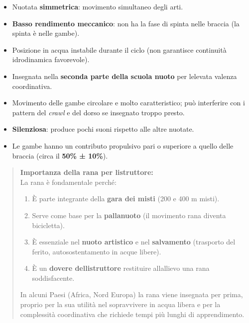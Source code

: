 \documentclass[a4paper,11pt]{article}
\providecommand{\tightlist}{%
  \setlength{\itemsep}{0pt}\setlength{\parskip}{0pt}}
\begin{document}
\begin{itemize}
      \tightlist
      \item
            Nuotata \textbf{simmetrica}: movimento simultaneo degli arti.
      \item
            \textbf{Basso rendimento meccanico}: non ha la fase di spinta nelle
            braccia (la spinta è nelle gambe).
      \item
            Posizione in acqua instabile durante il ciclo (non garantisce
            continuità idrodinamica favorevole).
      \item
            Insegnata nella \textbf{seconda parte della scuola nuoto} per
            l\textquotesingle elevata valenza coordinativa.
      \item
            Movimento delle gambe circolare e molto caratteristico; può
            interferire con i pattern del \emph{crawl} e del dorso se insegnato
            troppo presto.
      \item
            \textbf{Silenziosa}: produce pochi suoni rispetto alle altre nuotate.
      \item
            Le gambe hanno un contributo propulsivo pari o superiore a quello
            delle braccia (circa il \textbf{50\% ± 10\%}).
\end{itemize}

\begin{quote}
      \textbf{Importanza della rana per l\textquotesingle istruttore:}\\
      La rana è fondamentale perché:

      \begin{enumerate}
            \tightlist
            \item
                  È parte integrante della \textbf{gara dei misti} (200 e 400 m misti).
            \item
                  Serve come base per la \textbf{pallanuoto} (il movimento rana diventa
                  bicicletta).
            \item
                  È essenziale nel \textbf{nuoto artistico} e nel \textbf{salvamento}
                  (trasporto del ferito, autosostentamento in acque libere).
            \item
                  È un \textbf{dovere dell\textquotesingle istruttore} restituire
                  all\textquotesingle allievo una rana soddisfacente.
      \end{enumerate}

      In alcuni Paesi (Africa, Nord Europa) la rana viene insegnata per prima,
      proprio per la sua utilità nel sopravvivere in acqua libera e per la
      complessità coordinativa che richiede tempi più lunghi di apprendimento.
\end{quote}
\end{document}
